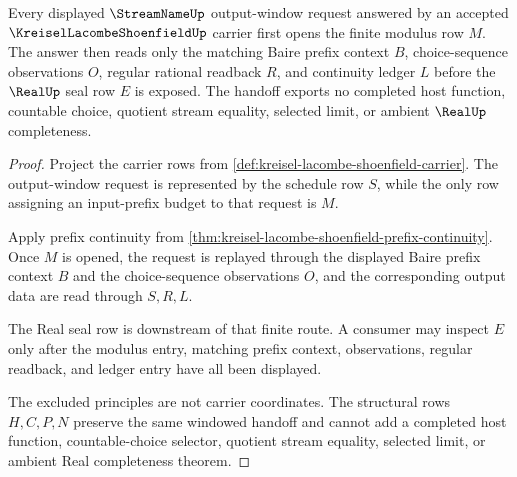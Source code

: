 \begin{theorem}\label{thm:kreisel-lacombe-shoenfield-streamname-modulus}
Every displayed $\StreamNameUp$ output-window request answered by an accepted $\KreiselLacombeShoenfieldUp$ carrier first opens the finite modulus row $M$. The answer then reads only the matching Baire prefix context $B$, choice-sequence observations $O$, regular rational readback $R$, and continuity ledger $L$ before the $\RealUp$ seal row $E$ is exposed. The handoff exports no completed host function, countable choice, quotient stream equality, selected limit, or ambient $\RealUp$ completeness.
\end{theorem}
\begin{proof}
Project the carrier rows from \autoref{def:kreisel-lacombe-shoenfield-carrier}. The output-window request is represented by the schedule row $S$, while the only row assigning an input-prefix budget to that request is $M$.

Apply prefix continuity from \autoref{thm:kreisel-lacombe-shoenfield-prefix-continuity}. Once $M$ is opened, the request is replayed through the displayed Baire prefix context $B$ and the choice-sequence observations $O$, and the corresponding output data are read through $S,R,L$.

The Real seal row is downstream of that finite route. A consumer may inspect $E$ only after the modulus entry, matching prefix context, observations, regular readback, and ledger entry have all been displayed.

The excluded principles are not carrier coordinates. The structural rows $H,C,P,N$ preserve the same windowed handoff and cannot add a completed host function, countable-choice selector, quotient stream equality, selected limit, or ambient Real completeness theorem.
\end{proof}

